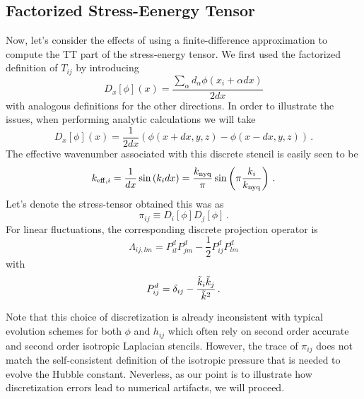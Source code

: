 \documentclass{revtex4}
\begin{document}
\subsection{Factorized Stress-Eenergy Tensor}
Now, let's consider the effects of using a finite-difference approximation to compute the TT part of the stress-energy tensor.
We first used the factorized definition of $T_{ij}$ by introducing
\begin{equation}
  D_x[\phi](x) = \frac{\sum_{\alpha}d_\alpha \phi(x_i+ \alpha dx)}{2dx}
\end{equation}
with analogous definitions for the other directions.
In order to illustrate the issues, when performing analytic calculations we will take
\begin{equation}
  \label{eqn:deriv_order_1}
  D_x[\phi](x) = \frac{1}{2dx}\left(\phi(x+dx,y,z)-\phi(x-dx,y,z)\right) \, .
\end{equation}
The effective wavenumber associated with this discrete stencil is easily seen to be
\begin{equation}
  k_{{\rm eff},i} = \frac{1}{dx}\sin\left(k_idx\right) = \frac{k_{\rm nyq}}{\pi}\sin\left(\pi\frac{k_i}{k_{\rm nyq}}\right) \, .
\end{equation}
Let's denote the stress-tensor obtained this was as
\begin{equation}
  \label{eqn:tij_factor}
  \pi_{ij} \equiv D_i[\phi]D_j[\phi] \, .
\end{equation}
For linear fluctuations, the corresponding discrete projection operator is
\begin{equation}
  \Lambda_{ij,lm} = P^{d}_{il}P^{d}_{jm} - \frac{1}{2}P^d_{ij}P^{d}_{lm}
\end{equation}
with
\begin{equation}
  P^{d}_{ij} = \delta_{ij} - \frac{\tilde{k}_i\tilde{k}_j}{\tilde{k}^2} \, .
\end{equation}

Note that this choice of discretization is already inconsistent with typical evolution schemes for both $\phi$ and $h_{ij}$ which often rely on second order accurate and second order isotropic Laplacian stencils.   However, the trace of $\pi_{ij}$ does not match the self-consistent definition of the isotropic pressure that is needed to evolve the Hubble constant.
Neverless, as our point is to illustrate how discretization errors lead to numerical artifacts, we will proceed.
\end{document}
